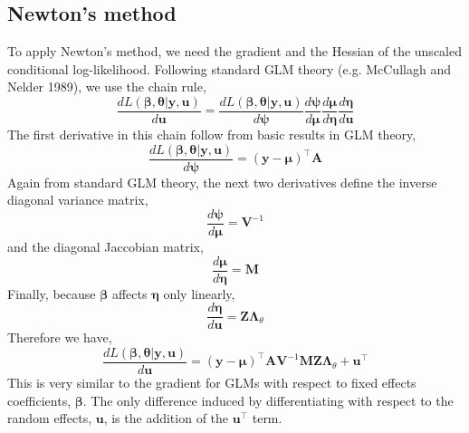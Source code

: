 \documentclass{jss}
\begin{document}
\subsection{Newton's method}

To apply Newton's method, we need the gradient and the Hessian of the
unscaled conditional log-likelihood. Following standard GLM theory
(e.g. McCullagh and Nelder 1989), we use the chain rule,
\begin{displaymath}
\frac{d L(\bm\beta, \bm\theta | \bm y, \bm u)}{d \bm u} = 
\frac{d L(\bm\beta, \bm\theta | \bm y, \bm u)}{d \bm\psi}
\frac{d \bm\psi}{d \bm\mu}
\frac{d \bm\mu}{d \bm\eta}
\frac{d \bm\eta}{d \bm u}
\end{displaymath}
The first derivative in this chain follow from basic results in GLM theory,
\begin{displaymath}
\frac{d L(\bm\beta, \bm\theta | \bm y, \bm u)}{d \bm\psi} = 
(\bm y - \bm\mu)^\top \bm A
\end{displaymath}
Again from standard GLM theory, the next two derivatives define the inverse diagonal variance
matrix,
\begin{displaymath}
\frac{d \bm\psi}{d \bm\mu} = \bm V^{-1}
\end{displaymath}
and the diagonal Jaccobian matrix,
\begin{displaymath}
\frac{d \bm\mu}{d \bm\eta} = \bm M
\end{displaymath}
Finally, because $\bm\beta$ affects $\bm\eta$ only linearly,
\begin{displaymath}
\frac{d \bm\eta}{d \bm u} = \bm Z \bm\Lambda_\theta
\end{displaymath}
Therefore we have,
\begin{equation}
\frac{d L(\bm\beta, \bm\theta | \bm y, \bm u)}{d \bm u} = 
(\bm y - \bm\mu)^\top \bm A
\bm V^{-1}
\bm M
\bm Z \bm\Lambda_\theta +
\bm u^\top
\label{eq:dPDEVdu}
\end{equation}
This is very similar to the gradient for GLMs with respect to fixed
effects coefficients, $\bm\beta$. The only difference induced by
differentiating with respect to the random effects, $\bm u$, is the
addition of the $\bm u^\top$ term.
\end{document}
